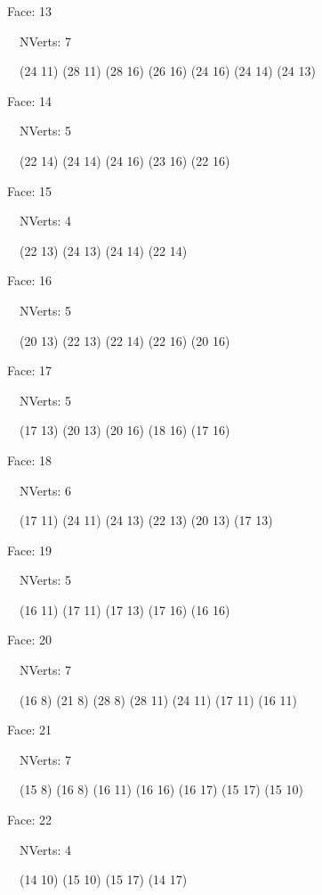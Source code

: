 \documentclass{article}
\begin{document}
{\footnotesize 

Face: 13

\   \    NVerts: 7

 \   \   (24 11) (28 11) (28 16) (26 16) (24 16) (24 14) (24 13)}

{\footnotesize 

Face: 14

\   \    NVerts: 5

 \   \   (22 14) (24 14) (24 16) (23 16) (22 16)}

{\footnotesize 

Face: 15

\   \    NVerts: 4

 \   \   (22 13) (24 13) (24 14) (22 14)}

{\footnotesize 

Face: 16

\   \    NVerts: 5

 \   \   (20 13) (22 13) (22 14) (22 16) (20 16)}

{\footnotesize 

Face: 17

\   \    NVerts: 5

 \   \   (17 13) (20 13) (20 16) (18 16) (17 16)}

{\footnotesize 

Face: 18

\   \    NVerts: 6

 \   \   (17 11) (24 11) (24 13) (22 13) (20 13) (17 13)}

{\footnotesize 

Face: 19

\   \    NVerts: 5

 \   \   (16 11) (17 11) (17 13) (17 16) (16 16)}

{\footnotesize 

Face: 20

\   \    NVerts: 7

 \   \   (16 8) (21 8) (28 8) (28 11) (24 11) (17 11) (16 11)}

{\footnotesize 

Face: 21

\   \    NVerts: 7

 \   \   (15 8) (16 8) (16 11) (16 16) (16 17) (15 17) (15 10)}

{\footnotesize 

Face: 22

\   \    NVerts: 4

 \   \   (14 10) (15 10) (15 17) (14 17)}
\end{document}

